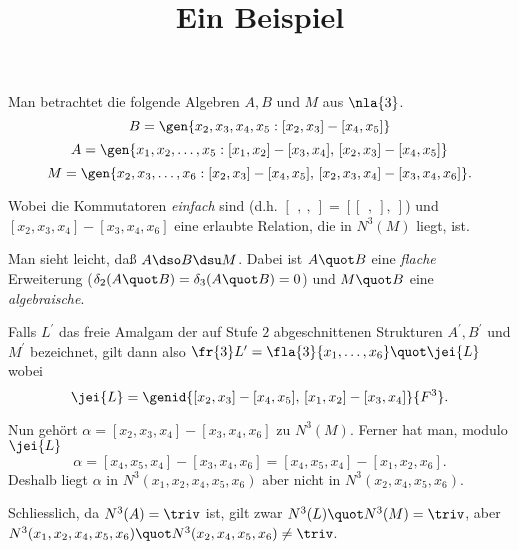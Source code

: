\documentclass[english,german,11pt]{article}
\title{Ein Beispiel}
\author{}
\date{}
\begin{document}
\maketitle
Man betrachtet die folgende Algebren $A,B$ und $M$ aus $\nla{3}$.
$$B=\gen{x_{2},x_{3},x_{4},x_{5}:[x_{2},x_{3}]-[x_{4},x_{5}]}$$
$$A=\gen{x_{1},x_{2},\dots,x_{5}:[x_{1},x_{2}]-[x_{3},x_{4}],\,[x_{2},x_{3}]-[x_{4},x_{5}]}$$
$$M=\gen{x_{2},x_{3},\dots,x_{6}:[x_{2},x_{3}]-[x_{4},x_{5}],\,[x_{2},x_{3},x_{4}]-[x_{3},x_{4},x_{6}]}.$$

Wobei die Kommutatoren \emph{einfach} sind (d.h. $[\,\:,\:,\:]=[[\,\:,\:],\:]$) und
$[x_{2},x_{3},x_{4}]-[x_{3},x_{4},x_{6}]$ eine erlaubte Relation, die in $N^{3}(M)$ liegt, ist.

\smallskip
Man sieht leicht, da{\ss} $A\dso B\dsu M$. Dabei ist $A\quot B$ eine \emph{flache} Erweiterung
($\delta_{2}(A\quot B)=\delta_{3}(A\quot B)=0$) und
$M\quot B$ eine \emph{algebraische}.

\smallskip
Falls $L^{\prime}$ das freie Amalgam der auf Stufe $2$ abgeschnittenen Strukturen $A^{\prime},B^{\prime}$ und $M^{\prime}$ bezeichnet, gilt dann also $\fr{3}L^{\prime}=\fla{3}{x_{1},\dots,x_{6}}\quot\jei{L}$ wobei
$$\jei{L}=\genid{[x_{2},x_{3}]-[x_{4},x_{5}],\,[x_{1},x_{2}]-[x_{3},x_{4}]}{F^{3}}.$$

Nun geh\"ort $\alpha=[x_{2},x_{3},x_{4}]-[x_{3},x_{4},x_{6}]$ zu $N^{3}(M)$. Ferner hat man, modulo $\jei{L}$
$$\alpha=[x_{4},x_{5},x_{4}]-[x_{3},x_{4},x_{6}]=[x_{4},x_{5},x_{4}]-[x_{1},x_{2},x_{6}].$$
Deshalb liegt $\alpha$ in $N^{3}(x_{1},x_{2},x_{4},x_{5},x_{6})$ aber nicht in $N^{3}(x_{2},x_{4},x_{5},x_{6})$.

Schliesslich, da $N^{3}(A)=\triv$ ist, gilt zwar $N^{3}(L)\quot N^{3}(M)=\triv$, aber $N^{3}(x_{1},x_{2},x_{4},x_{5},x_{6})\quot N^{3}(x_{2},x_{4},x_{5},x_{6})\neq\triv$.
\pagestyle{empty}
\end{document}
